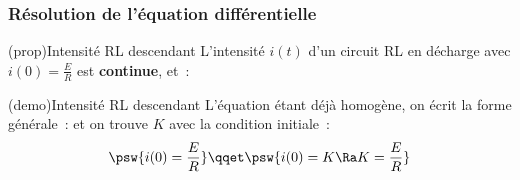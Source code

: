 \documentclass[../../main/main.tex]{subfiles}
\begin{document}
\subsubsection{Résolution de l'équation différentielle}
\begin{tcb*}[label=prop:rlsoludech](prop){Intensité RL descendant}
	L'intensité $i(t)$ d'un circuit RL en décharge avec $i(0) = \frac{E}{R}$ est
	\textbf{continue}, et~:
	\psw{%
		\[\boxed{i(t) = \frac{E}{R}\exp\left(-\frac{t}{\tau}\right)}\]
	}%
\end{tcb*}
\begin{tcb*}[label=demo:rlsoludech](demo){Intensité RL descendant}
	L'équation étant déjà homogène, on écrit la forme générale~:
	\psw{%
		\[i(t) = K\exp\left( -\frac{t}{\tau} \right)\]
	}%
	et on trouve $K$ avec la condition initiale~:
	\[
		\psw{i(0) = \frac{E}{R}}
		\qqet
		\psw{i(0) = K \Ra K=\frac{E}{R}}
	\]
\end{tcb*}
\end{document}
